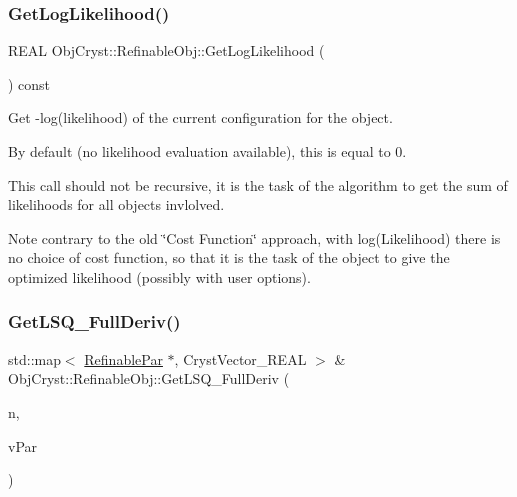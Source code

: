 \subsubsection{\texorpdfstring{GetLogLikelihood()}{GetLogLikelihood()}}
{\footnotesize\ttfamily R\+E\+AL Obj\+Cryst\+::\+Refinable\+Obj\+::\+Get\+Log\+Likelihood (\begin{DoxyParamCaption}{ }\end{DoxyParamCaption}) const\hspace{0.3cm}{\ttfamily [virtual]}}

Get -\/log(likelihood) of the current configuration for the object.

By default (no likelihood evaluation available), this is equal to 0.

This call should not be recursive, it is the task of the algorithm to get the sum of likelihoods for all objects invlolved.

\begin{DoxyNote}{Note}
contrary to the old \char`\"{}\+Cost Function\char`\"{} approach, with log(\+Likelihood) there is no \textquotesingle{}choice\textquotesingle{} of cost function, so that it is the task of the object to give the optimized likelihood (possibly with user options). 
\end{DoxyNote}
\mbox{\label{class_obj_cryst_1_1_refinable_obj_a83c6f2679b8dadd780e77b1f71d4cd02}} 
\subsubsection{\texorpdfstring{GetLSQ\_FullDeriv()}{GetLSQ\_FullDeriv()}}
{\footnotesize\ttfamily std\+::map$<$ \mbox{\hyperlink{class_obj_cryst_1_1_refinable_par}{Refinable\+Par}} $\ast$, Cryst\+Vector\+\_\+\+R\+E\+AL $>$ \& Obj\+Cryst\+::\+Refinable\+Obj\+::\+Get\+L\+S\+Q\+\_\+\+Full\+Deriv (\begin{DoxyParamCaption}\item[{const unsigned int}]{n,  }\item[{std\+::set$<$ \mbox{\hyperlink{class_obj_cryst_1_1_refinable_par}{Refinable\+Par}} $\ast$ $>$ \&}]{v\+Par }\end{DoxyParamCaption})\hspace{0.3cm}{\ttfamily [virtual]}}


